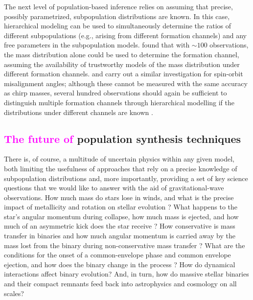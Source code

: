 \documentclass[iop,onecolumn]{revtex4}
\newcommand{\ilya}[1]{\textcolor{magenta}{#1}}
\begin{document}
The next level of population-based inference relies on assuming that precise, possibly parametrized, subpopulation distributions are known.  In this case, hierarchical modeling \citep[extreme deconvolution in the language of][]{Hogg:2010} can be used to simultaneously determine the ratios of different subpopulations (e.g., arising from different formation channels) and any free parameters in the subpopulation models.  \citet{Zevin:2017} found that with $\sim 100$ observations, the mass distribution alone could be used to determine the formation channel, assuming the availability of trustworthy models of the mass distribution under different formation channels.  \citet{Vitale:2015} and \citet{Stevenson:2017spin} carry out a similar investigation for spin-orbit misalignment angles; although these cannot be measured with the same accuracy as chirp masses, several hundred observations should again be sufficient to distinguish multiple formation channels through hierarchical modelling if the distributions under different channels are known \citep{Stevenson:2017spin}.  

\subsection{\ilya{The future of} population synthesis techniques}
There is, of course, a multitude of uncertain physics within any given model, both limiting the usefulness of approaches that rely on a precise knowledge of subpopulation distributions and, more importantly, providing a set of key science questions that we would like to answer with the aid of gravitational-wave observations.  How much mass do stars lose in winds, and what is the precise impact of metallicity and rotation on stellar evolution \citep[e.g.,][]{Renzo:2017}?  What happens to the star's angular momentum during collapse, how much mass is ejected, and how much of an asymmetric kick does the star receive \citep[e.g.,][]{Mirabel:2016}? How conservative is mass transfer in binaries and how much angular momentum is carried away by the mass lost from the binary during non-conservative mass transfer \citep[e.g.,][]{vandenHeuvel:2017,Kruckow:2018}?  What are the conditions for the onset of a common-envelope phase and common envelope ejection, and how does the binary change in the process \citep[e.g.,][]{Ivanova:2013,Kruckow:2016}?   How do dynamical interactions affect binary evolution?  And, in turn, how do massive stellar binaries and their compact remnants feed back into astrophysics and cosmology on all scales?
\end{document}
